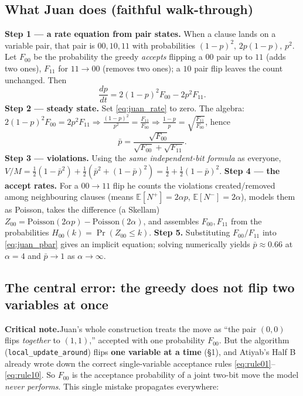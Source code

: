 \documentclass[11pt]{article}
\newcommand{\crit}[1]{%
  \par\smallskip\noindent
  \colorbox{red!8}{\parbox{\dimexpr\linewidth-2\fboxsep}{%
  \textbf{Critical note.}\quad #1}}\par\smallskip}
\newcommand{\E}{\mathbb{E}}
\begin{document}
\subsection{What Juan does (faithful walk-through)}
\textbf{Step 1 --- a rate equation from pair states.} When a clause lands on a variable pair, that
pair is $00,10,11$ with probabilities $(1-p)^2,\,2p(1-p),\,p^2$. Let $F_{00}$ be the probability
the greedy \emph{accepts} flipping a $00$ pair up to $11$ (adds two ones), $F_{11}$ for $11\to00$
(removes two ones); a $10$ pair flip leaves the count unchanged. Then
\begin{equation}
\frac{dp}{dt}=2(1-p)^2F_{00}-2p^2F_{11}.
\label{eq:juan_rate}
\end{equation}
\textbf{Step 2 --- steady state.} Set \eqref{eq:juan_rate} to zero. The algebra:
$2(1-p)^2F_{00}=2p^2F_{11}\Rightarrow \tfrac{(1-p)^2}{p^2}=\tfrac{F_{11}}{F_{00}}
\Rightarrow \tfrac{1-p}{p}=\sqrt{\tfrac{F_{11}}{F_{00}}}$, hence
\begin{equation}
\bar p=\frac{\sqrt{F_{00}}}{\sqrt{F_{00}}+\sqrt{F_{11}}}.
\label{eq:juan_pbar}
\end{equation}
\textbf{Step 3 --- violations.} Using the \emph{same independent-bit formula} as everyone,
$V/M=\tfrac12(1-\bar p^2)+\tfrac12(\bar p^2+(1-\bar p)^2)=\tfrac12+\tfrac12(1-\bar p)^2$.
\textbf{Step 4 --- the accept rates.} For a $00\to11$ flip he counts the violations created/removed
among neighbouring clauses (means $\E[N^+]=2\alpha p$, $\E[N^-]=2\alpha$), models them as Poisson,
takes the difference (a Skellam) $Z_{00}=\mathrm{Poisson}(2\alpha p)-\mathrm{Poisson}(2\alpha)$,
and assembles $F_{00},F_{11}$ from the probabilities $H_{00}(k)=\Pr(Z_{00}\le k)$.
\textbf{Step 5.} Substituting $F_{00}/F_{11}$ into \eqref{eq:juan_pbar} gives an implicit equation;
solving numerically yields $\bar p\approx0.66$ at $\alpha=4$ and $\bar p\to1$ as $\alpha\to\infty$.

\subsection{The central error: the greedy does not flip two variables at once}
\crit{Juan's whole construction treats the move as ``the pair $(0,0)$ flips \emph{together} to
$(1,1)$,'' accepted with one probability $F_{00}$. But the algorithm
(\texttt{local\_update\_around}) flips \textbf{one variable at a time} (\S1), and Atiyab's Half B
already wrote down the correct single-variable acceptance rules
\eqref{eq:rule01}--\eqref{eq:rule10}. So $F_{00}$ is the acceptance probability of a joint two-bit
move the model \emph{never performs}. This single mistake propagates everywhere:}
\end{document}
